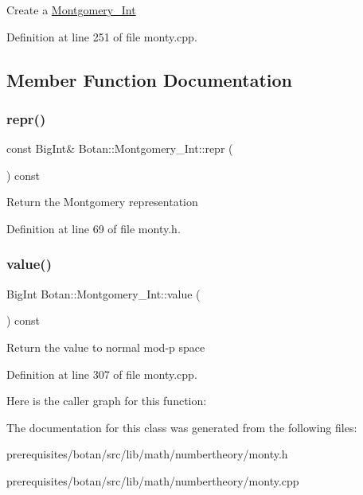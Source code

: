 Create a \mbox{\hyperlink{class_botan_1_1_montgomery___int}{Montgomery\+\_\+\+Int}} 

Definition at line 251 of file monty.\+cpp.



\subsection{Member Function Documentation}
\mbox{\label{class_botan_1_1_montgomery___int_aad869bdd9eb0dd780774f430169d9af1}} 
\subsubsection{\texorpdfstring{repr()}{repr()}}
{\footnotesize\ttfamily const Big\+Int\& Botan\+::\+Montgomery\+\_\+\+Int\+::repr (\begin{DoxyParamCaption}{ }\end{DoxyParamCaption}) const\hspace{0.3cm}{\ttfamily [inline]}}

Return the Montgomery representation 

Definition at line 69 of file monty.\+h.

\mbox{\label{class_botan_1_1_montgomery___int_abc91331bc32dc00db87e8343f9839709}} 
\subsubsection{\texorpdfstring{value()}{value()}}
{\footnotesize\ttfamily Big\+Int Botan\+::\+Montgomery\+\_\+\+Int\+::value (\begin{DoxyParamCaption}{ }\end{DoxyParamCaption}) const}

Return the value to normal mod-\/p space 

Definition at line 307 of file monty.\+cpp.

Here is the caller graph for this function\+:


The documentation for this class was generated from the following files\+:\begin{DoxyCompactItemize}
\item 
prerequisites/botan/src/lib/math/numbertheory/monty.\+h\item 
prerequisites/botan/src/lib/math/numbertheory/monty.\+cpp\end{DoxyCompactItemize}
